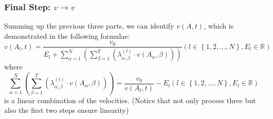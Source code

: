 \documentclass{article}
\begin{document}
	\subsubsection{Final Step: \(v\to v\)}
	Summing up the previous three parts, we can identify $v(A,t)$, which is demonstrated in the following formulae:
	$$v\left( A_l,t \right) =\frac{v_0}{E_l+\sum\limits_{\alpha =1}^N{\left( \sum\limits_{\beta =1}^T{\left( \lambda _{\alpha ,\beta}^{\left( l \right)}\cdot v\left( A_{\alpha},\beta \right) \right)} \right)}}\left( l\in \left\{ 1,2,...,N \right\} ,E_l\in \mathbb{R} \right)$$
	where
	$$\sum_{\alpha =1}^N{\left( \sum_{\beta =1}^T{\left( \lambda _{\alpha ,\beta}^{\left( l \right)}\cdot v\left( A_{\alpha},\beta \right) \right)} \right)}=\frac{v_0}{v\left( A_l,t \right)}-E_l\left( l\in \left\{ 1,2,...,N \right\} ,E_l\in \mathbb{R} \right)$$
	is a linear combination of the velocities. (Notice that not only process three but also the first two steps ensure linearity)
\end{document}
